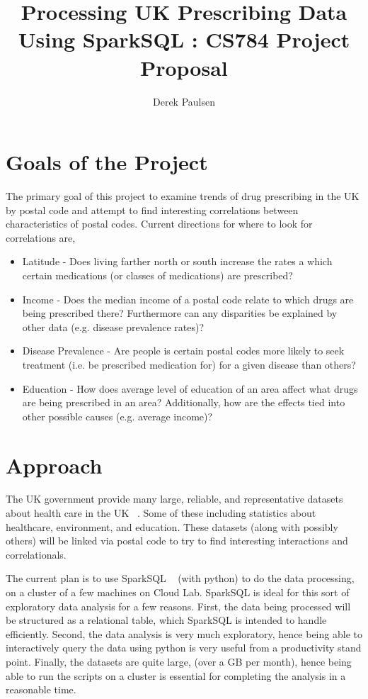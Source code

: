 \documentclass[a4paper]{article}
\author{Derek Paulsen}
\title{Processing UK Prescribing Data Using SparkSQL : CS784 Project Proposal}
\begin{document}
\maketitle
\section{Goals of the Project}
	The primary goal of this project to examine trends of drug prescribing in the UK by postal code
	and attempt to find interesting correlations between characteristics of postal codes. Current directions for where to look for correlations are, 
	\begin{itemize}
		\item Latitude - Does living farther north or south increase the rates a which certain medications (or classes of medications) are 
				prescribed?
		\item Income - Does the median income of a postal code relate to which drugs are being prescribed there? Furthermore
				 	can any disparities be explained by other data (e.g. disease prevalence rates)?

		\item Disease Prevalence - Are people is certain postal codes more likely to seek treatment (i.e. be prescribed medication for) for a given disease than others?

		\item Education - How does average level of education of an area affect what drugs are being prescribed in an area?
							Additionally, how are the effects tied into other possible causes (e.g. average income)?
	\end{itemize}

\section{Approach}
	The UK government provide many large, reliable, and representative datasets about health care in the UK ~\cite{ref:UKDataSets}. Some of 
	these including statistics about healthcare, environment, and education. These datasets (along with possibly others) will 
	be linked via postal code to try to find interesting interactions and correlationals.

	The current plan is to use SparkSQL ~\cite{ref:SparkSQL} (with python) to do the data processing, on a cluster of a few machines on Cloud Lab. 
	SparkSQL is ideal for this sort of exploratory data analysis for a few reasons. First, the data being processed will be 
	structured as a relational table, which SparkSQL is intended to handle efficiently. Second, the data analysis
	is very much exploratory, hence being able to interactively query the data using python is very useful from 
	a productivity stand point. Finally, the datasets are quite large, (over a GB per month), hence being able to 
	run the scripts on a cluster is essential for completing the analysis in a reasonable time.
\end{document}
